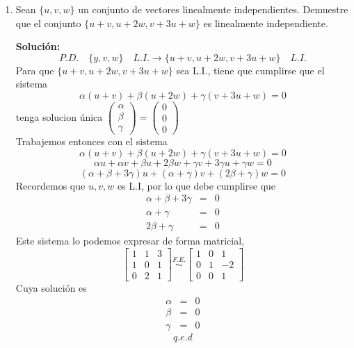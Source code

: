 \documentclass[12pt]{article}
\newenvironment{solucion}
{\begin{mdframed}[backgroundcolor=black!10]
		{\bf Solución:}\\
	}
	{
	\end{mdframed}
}
\newenvironment{preguntas}
{\begin{enumerate}\itemsep12pt
	}
	{
	\end{enumerate}
}
\newcommand{\ra}{\rightarrow}
\begin{document}
\begin{preguntas}
\begin{solucion}
$$\begin{bmatrix}
	1 & -2 & h\\
	0 & 1 & 0\\
	0 & 3 & 2h-2
	\end{bmatrix} \sim 
	\begin{bmatrix}
	1 & -2 & h\\
	0 & 1 & 0\\
	0 & 0 & 2h-2
	\end{bmatrix}$$
	Luego, para que la matriz tenga 2 pivotes, debe ocurrir que
	$$2h-2 = 0 \ra h = 1$$
\end{solucion}
\item Sean $\{u, v, w\}$ un conjunto de vectores linealmente independientes. Demuestre que el conjunto $\{u+v, u+2w, v+3u+w\}$ es linealmente independiente.
\begin{solucion}
$$P.D. \quad \{y, v, w\}\quad L.I. \ra \{u+v, u+2w, v+3u+w\}\quad L.I.$$
		Para que $\{u+v, u+2w, v+3u+w\}$ sea L.I., tiene que cumplirse que el sistema
		$$\alpha(u+v) + \beta(u+2w) + \gamma(v+3u+w) = 0$$
		tenga solucion única $\begin{pmatrix}
		\alpha\\ \beta \\ \gamma
		\end{pmatrix} = \begin{pmatrix} 0\\0\\0\end{pmatrix}$\\
		Trabajemos entonces con el sistema
		$$\alpha(u+v) + \beta(u+2w) + \gamma(v+3u+w) = 0$$
		$$\alpha u+ \alpha v + \beta u+2\beta w + \gamma v+3\gamma u+\gamma w = 0$$
		$$(\alpha + \beta + 3 \gamma)u + (\alpha + \gamma)v + (2\beta + \gamma)w = 0$$
		Recordemos que ${u, v, w}$ es L.I, por lo que debe cumplirse que
		$$\begin{array}{rcl}
		\alpha + \beta + 3 \gamma & = & 0\\
		\alpha + \gamma & = & 0\\
		2\beta + \gamma & = & 0
		\end{array}$$
		Este sistema lo podemos expresar de forma matricial,
		$$\begin{bmatrix}
		1 & 1 & 3\\
		1 & 0 & 1 \\
		0 & 2 & 1
		\end{bmatrix} \stackrel{F.E.}{\sim} \begin{bmatrix}
		1 & 0 & 1\\
		0 & 1 & -2\\
		0 & 0 & 1
		\end{bmatrix}$$
		Cuya solución es
		$$\begin{array}{rcl}
		\alpha & = & 0\\
		\beta & = & 0\\
		\gamma & = & 0
		\end{array}$$
		$$q.e.d$$
	

\end{solucion}
\end{preguntas}
\end{document}
